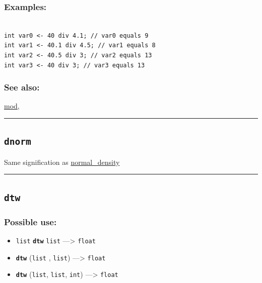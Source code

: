 \documentclass[]{book}
\providecommand{\tightlist}{%
  \setlength{\itemsep}{0pt}\setlength{\parskip}{0pt}}
\theoremstyle{definition}
\theoremstyle{definition}
\theoremstyle{definition}
\theoremstyle{remark}
\begin{document}
\subsubsection{Examples:}\label{examples-107}

\begin{verbatim}
 
int var0 <- 40 div 4.1; // var0 equals 9 
int var1 <- 40.1 div 4.5; // var1 equals 8 
int var2 <- 40.5 div 3; // var2 equals 13 
int var3 <- 40 div 3; // var3 equals 13
\end{verbatim}

\subsubsection{See also:}\label{see-also-84}

\href{operators-i-to-m.html\#mod}{mod},

\begin{center}\rule{0.5\linewidth}{\linethickness}\end{center}

\subsection{\texorpdfstring{\texttt{dnorm}}{dnorm}}\label{dnorm}

Same signification as
\href{operators-n-to-r.html\#normal_density}{normal\_density}

\begin{center}\rule{0.5\linewidth}{\linethickness}\end{center}

\subsection{\texorpdfstring{\texttt{dtw}}{dtw}}\label{dtw}

\subsubsection{Possible use:}\label{possible-use-141}

\begin{itemize}
\tightlist
\item
  \texttt{list} \textbf{\texttt{dtw}} \texttt{list} ---\textgreater{}
  \texttt{float}
\item
  \textbf{\texttt{dtw}} (\texttt{list} , \texttt{list})
  ---\textgreater{} \texttt{float}
\item
  \textbf{\texttt{dtw}} (\texttt{list}, \texttt{list}, \texttt{int})
  ---\textgreater{} \texttt{float}
\end{itemize}
\end{document}
